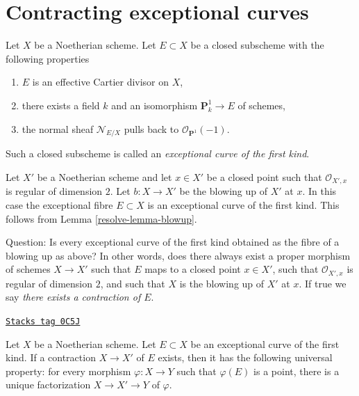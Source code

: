 \section{Contracting exceptional curves}
\label{resolve-section-minus-one}
Let $X$ be a Noetherian scheme. Let $E \subset X$ be a closed
subscheme with the following properties
\begin{enumerate}
\item $E$ is an effective Cartier divisor on $X$,
\item there exists a field $k$ and an isomorphism $\mathbf{P}^1_k \to E$
of schemes,
\item the normal sheaf $\mathcal{N}_{E/X}$ pulls back to
$\mathcal{O}_{\mathbf{P}^1}(-1)$.
\end{enumerate}
Such a closed subscheme is called an {\it exceptional curve of the first kind}.

\medskip\noindent
Let $X'$ be a Noetherian scheme and let $x \in X'$ be a closed point
such that $\mathcal{O}_{X', x}$ is regular of dimension $2$. Let
$b : X \to X'$ be the blowing up of $X'$ at $x$. In this case the
exceptional fibre $E \subset X$ is an exceptional curve of the first
kind. This follows from Lemma \ref{resolve-lemma-blowup}.

\medskip\noindent
Question: Is every exceptional curve of the first kind obtained
as the fibre of a blowing up as above? In other words, does there
always exist a proper morphism of schemes $X \to X'$ such that
$E$ maps to a closed point $x \in X'$, such that $\mathcal{O}_{X', x}$
is regular of dimension $2$, and such that $X$ is the blowing up
of $X'$ at $x$. If true we say {\it there exists a contraction of $E$}.

\begin{lemma}
\label{resolve-lemma-factor-through-contraction}
\href{https://stacks.math.columbia.edu/tag/0C5J}{\texttt{Stacks tag 0C5J}}

Let $X$ be a Noetherian scheme. Let $E \subset X$ be an
exceptional curve of the first kind. If a contraction $X \to X'$
of $E$ exists, then it has the following universal property:
for every morphism $\varphi : X \to Y$ such that $\varphi(E)$
is a point, there is a unique factorization
$X \to X' \to Y$ of $\varphi$.
\end{lemma}

